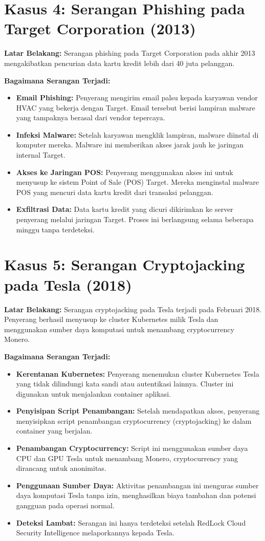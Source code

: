\documentclass[12pt]{article}
\begin{document}
\section*{Kasus 4: Serangan Phishing pada Target Corporation (2013)}
\textbf{Latar Belakang:} 
Serangan phishing pada Target Corporation pada akhir 2013 mengakibatkan pencurian data kartu kredit lebih dari 40 juta pelanggan.

\textbf{Bagaimana Serangan Terjadi:}
\begin{itemize}
    \item \textbf{Email Phishing:} Penyerang mengirim email palsu kepada karyawan vendor HVAC yang bekerja dengan Target. Email tersebut berisi lampiran malware yang tampaknya berasal dari vendor tepercaya.
    \item \textbf{Infeksi Malware:} Setelah karyawan mengklik lampiran, malware diinstal di komputer mereka. Malware ini memberikan akses jarak jauh ke jaringan internal Target.
    \item \textbf{Akses ke Jaringan POS:} Penyerang menggunakan akses ini untuk menyusup ke sistem Point of Sale (POS) Target. Mereka menginstal malware POS yang mencuri data kartu kredit dari transaksi pelanggan.
    \item \textbf{Exfiltrasi Data:} Data kartu kredit yang dicuri dikirimkan ke server penyerang melalui jaringan Target. Proses ini berlangsung selama beberapa minggu tanpa terdeteksi.
\end{itemize}

\section*{Kasus 5: Serangan Cryptojacking pada Tesla (2018)}
\textbf{Latar Belakang:} 
Serangan cryptojacking pada Tesla terjadi pada Februari 2018. Penyerang berhasil menyusup ke cluster Kubernetes milik Tesla dan menggunakan sumber daya komputasi untuk menambang cryptocurrency Monero.

\textbf{Bagaimana Serangan Terjadi:}
\begin{itemize}
    \item \textbf{Kerentanan Kubernetes:} Penyerang menemukan cluster Kubernetes Tesla yang tidak dilindungi kata sandi atau autentikasi lainnya. Cluster ini digunakan untuk menjalankan container aplikasi.
    \item \textbf{Penyisipan Script Penambangan:} Setelah mendapatkan akses, penyerang menyisipkan script penambangan cryptocurrency (cryptojacking) ke dalam container yang berjalan.
    \item \textbf{Penambangan Cryptocurrency:} Script ini menggunakan sumber daya CPU dan GPU Tesla untuk menambang Monero, cryptocurrency yang dirancang untuk anonimitas.
    \item \textbf{Penggunaan Sumber Daya:} Aktivitas penambangan ini menguras sumber daya komputasi Tesla tanpa izin, menghasilkan biaya tambahan dan potensi gangguan pada operasi normal.
    \item \textbf{Deteksi Lambat:} Serangan ini hanya terdeteksi setelah RedLock Cloud Security Intelligence melaporkannya kepada Tesla.
\end{itemize}
\end{document}

